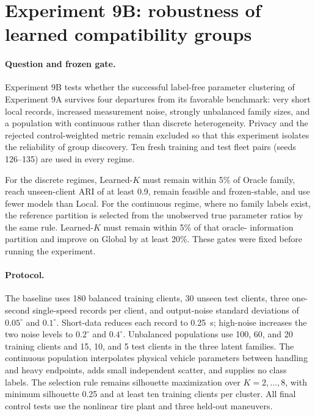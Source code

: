 \section{Experiment 9B: robustness of learned compatibility groups}
\label{sec:experiment9b}

\paragraph{Question and frozen gate.}
Experiment 9B tests whether the successful label-free parameter clustering of
Experiment 9A survives four departures from its favorable benchmark: very
short local records, increased measurement noise, strongly unbalanced family
sizes, and a population with continuous rather than discrete heterogeneity.
Privacy and the rejected control-weighted metric remain excluded so that this
experiment isolates the reliability of group discovery. Ten fresh training and
test fleet pairs (seeds 126--135) are used in every regime.

For the discrete regimes, Learned-$K$ must remain within 5\% of Oracle family,
reach unseen-client ARI of at least 0.9, remain feasible and frozen-stable, and
use fewer models than Local. For the continuous regime, where no family labels
exist, the reference partition is selected from the unobserved true parameter
ratios by the same rule. Learned-$K$ must remain within 5\% of that oracle-
information partition and improve on Global by at least 20\%. These gates were
fixed before running the experiment.

\paragraph{Protocol.}
The baseline uses 180 balanced training clients, 30 unseen test clients, three
one-second single-speed records per client, and output-noise standard deviations
of $0.05^\circ$ and $0.1^\circ$. Short-data reduces each record to 0.25~s;
high-noise increases the two noise levels to $0.2^\circ$ and $0.4^\circ$.
Unbalanced populations use 100, 60, and 20 training clients and 15, 10, and 5
test clients in the three latent families. The continuous population
interpolates physical vehicle parameters between handling and heavy endpoints,
adds small independent scatter, and supplies no class labels. The selection
rule remains silhouette maximization over $K=2,\ldots,8$, with minimum
silhouette 0.25 and at least ten training clients per cluster. All final control
tests use the nonlinear tire plant and three held-out maneuvers.

